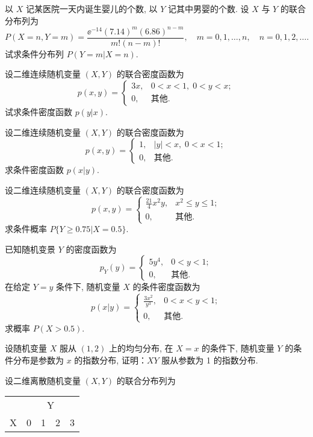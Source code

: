 	\begin{xiti}
		\item 	以 $X$ 记某医院一天内诞生婴儿的个数, 以 $Y$ 记其中男婴的个数. 设 $X$ 与 $Y$ 的联合分布列为
		\[
			P(X=n, Y=m)=\frac{\ee^{-14}(7.14)^{m}(6.86)^{n-m}}{m !(n-m) !}, \quad m=0,1, \ldots, n, \quad n=0,1,2, \ldots.
			\]
			试求条件分布列 $P(Y=m|X=n)$.
		\item 设二维连续随机变量 $(X,Y)$ 的联合密度函数为
		\[
			p(x, y)=\begin{cases}3 x, & 0<x<1,\; 0<y<x; \\
			 0, & 	\text{其他}.\end{cases}\]
			 试求条件密度函数 $p(y|x)$.
		\item 设二维连续随机变量 $(X,Y)$ 的联合密度函数为
		\[
		p(x, y)=\begin{cases}1, & |y|<x,\;0<x<1; \\
		   0,& \text{其他}.\end{cases}
		   \]
		   求条件密度函数 $p(x|y)$.
		\item 设二维连续随机变量 $(X,Y)$ 的联合密度函数为
		   \[
			   p(x,y)=\begin{cases}
				   \frac{21}{4}x^2 y, &	x^2\leq y \leq 1;\\
				   0,	&	\text{其他}.
			   \end{cases}\]
			   求条件概率 $P\{Y\geq 0.75|X=0.5\}$.
		\item 已知随机变景 $Y$ 的密度函数为
			\[
				p_Y(y)=\begin{cases}
					5y^4,&	0<y<1;\\
					0,&		\text{其他}.
				\end{cases}\]
				在给定 $Y=y$ 条件下, 随机变量 $X$ 的条件密度函数为
			\[
				p(x|y)=\begin{cases}
					\frac{3x^2}{y^3},&	0<x<y<1;\\
					0,&		\text{其他}.
				\end{cases}\]
			求概率 $P(X>0.5)$.
		\item 设随机变量 $X$ 服从 $(1,2)$ 上的均匀分布, 在 $X=x$ 的条件下, 随机变量 $Y$ 的条件分布是参数为 $x$ 
		的指数分布, 证明：$XY$ 服从参数为 1 的指数分布.
		\item 设二维离散随机变量 $(X,Y)$ 的联合分布列为
			\begin{center}
				\begin{tabularx}{0.8\textwidth}{YYYYY}
					\toprule
					&  \\
				  X     & 0     & 1     & 2     & 3 \\

\end{tabularx}
\end{center}
\end{xiti}
